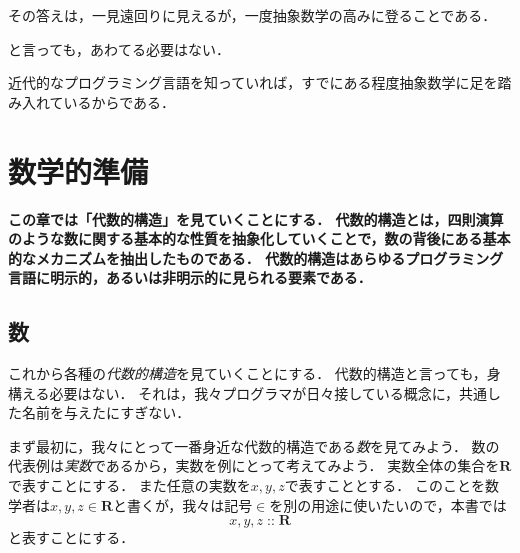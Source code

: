 \documentclass[twocolumn]{jsbook}
\DeclareMathOperator{\mathIn}{::}
\newcommand{\mathSet}[1]{\mathbf{#1}}
\newcommand{\keyword}[1]{\emph{#1}}
\newenvironment{leader}{\begingroup\bf}{\endgroup}
\begin{document}
その答えは，一見遠回りに見えるが，一度抽象数学の高みに登ることである．

と言っても，あわてる必要はない．

近代的なプログラミング言語を知っていれば，すでにある程度抽象数学に足を踏み入れているからである．

\chapter{数学的準備}

\begin{leader}
この章では「代数的構造」を見ていくことにする．
代数的構造とは，四則演算のような数に関する基本的な性質を抽象化していくことで，数の背後にある基本的なメカニズムを抽出したものである．
代数的構造はあらゆるプログラミング言語に明示的，あるいは非明示的に見られる要素である．
\end{leader}

\section{数}

これから各種の\keyword{代数的構造}を見ていくことにする．
代数的構造と言っても，身構える必要はない．
それは，我々プログラマが日々接している概念に，共通した名前を与えたにすぎない．

まず最初に，我々にとって一番身近な代数的構造である\keyword{数}を見てみよう．
数の代表例は\keyword{実数}であるから，実数を例にとって考えてみよう．
実数全体の集合を$\mathSet{R}$で表すことにする．
また任意の実数を$x,y,z$で表すこととする．
このことを数学者は$x,y,z\in\mathSet{R}$と書くが，我々は記号$\in$を別の用途に使いたいので，本書では$$x,y,z\mathIn\mathSet{R}$$と表すことにする．
\end{document}
